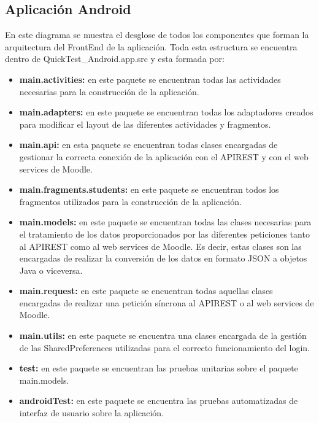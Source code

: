 \subsection{Aplicación Android}

En este diagrama se muestra el desglose de todos los componentes que forman la arquitectura del FrontEnd de la aplicación. Toda esta estructura se encuentra dentro de QuickTest\_Android.app.src y esta formada por:

\begin{itemize}

	\item \textbf{main.activities:} en este paquete se encuentran todas las actividades necesarias para la construcción de la aplicación.
	\item \textbf{main.adapters:} en este paquete se encuentran todas los adaptadores creados para modificar el layout de las diferentes actividades y fragmentos.
	\item \textbf{main.api:} en esta paquete se encuentran todas clases encargadas de gestionar la correcta conexión de la aplicación con el APIREST y con el web services de Moodle.
	\item \textbf{main.fragments.students:} en este paquete se encuentran todos los fragmentos utilizados para la construcción de la aplicación.
	\item \textbf{main.models:} en este paquete se encuentran todas las clases necesarias para el tratamiento de los datos proporcionados por las diferentes peticiones tanto al APIREST como al web services de Moodle. Es decir, estas clases son las encargadas de realizar la conversión de los datos en formato JSON a objetos Java o viceversa.
	\item \textbf{main.request:} en este paquete se encuentran todas aquellas clases encargadas de realizar una petición síncrona al APIREST o al web services de Moodle.
	\item \textbf{main.utils:} en este paquete se encuentra una clases encargada de la gestión de las SharedPreferences utilizadas para el correcto funcionamiento del login.
	\item \textbf{test:} en este paquete se encuentran las pruebas unitarias sobre el paquete main.models.
	\item \textbf{androidTest:} en este paquete se encuentra las pruebas automatizadas de interfaz de usuario sobre la aplicación.

\end{itemize}

